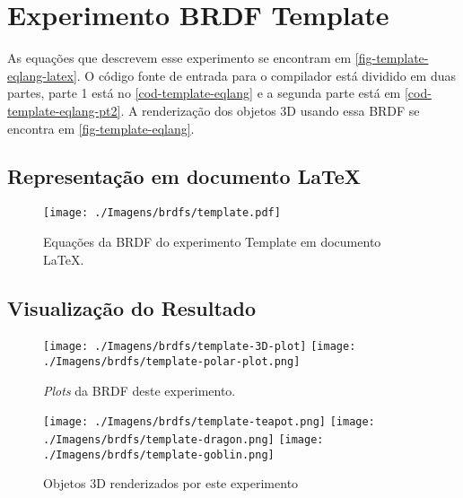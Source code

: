 \section{Experimento BRDF Template}

As equações que descrevem esse experimento se encontram em \autoref{fig-template-eqlang-latex}. O código fonte de entrada para o compilador está dividido em duas partes, parte 1 está no \autoref{cod-template-eqlang} e a segunda parte está em \autoref{cod-template-eqlang-pt2}. A renderização dos objetos 3D usando essa BRDF se encontra em \autoref{fig-template-eqlang}.

\subsection{Representação em documento \LaTeX{}}
\begin{figure}[H]
    \caption{\label{fig-template-eqlang-latex} \small Equações da BRDF do experimento Template em documento \LaTeX{}.}
    \begin{center}
        \texttt{[image: ./Imagens/brdfs/template.pdf]}
    \end{center}
\end{figure}

\subsection{Visualização do Resultado}
\begin{figure}[H]
    \caption{\small{\textit{Plots} da BRDF deste experimento.}}\label{fig-template-eqlang}
    \vspace{42px}
  \texttt{[image: ./Imagens/brdfs/template-3D-plot]}
\endminipage\hfill
{}
  \texttt{[image: ./Imagens/brdfs/template-polar-plot.png]}
\endminipage\hfill
\end{figure}

\begin{figure}[H]
    \caption{\small{Objetos 3D renderizados por este experimento}}\label{fig-template-eqlang}
  \texttt{[image: ./Imagens/brdfs/template-teapot.png]}
\endminipage\hfill
{}
  \texttt{[image: ./Imagens/brdfs/template-dragon.png]}
\endminipage\hfill
{}%
  \texttt{[image: ./Imagens/brdfs/template-goblin.png]}
\endminipage
\end{figure}

